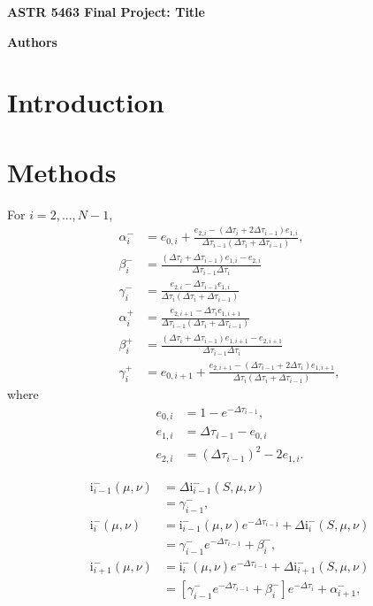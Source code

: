 \documentclass[12pt]{article}
\begin{document}
\begin{center}\begin{LARGE}
\textbf{ASTR 5463 Final Project: Title}
\end{LARGE}\end{center}

\begin{center}
\textbf{Authors}
\end{center}

\section{Introduction}



\section{Methods}

For $i = 2, ..., N - 1$,
\begin{align*}
\alpha_i^-
&=
e_{0, i} +
\frac{e_{2, i} - (\Delta\tau_i + 2\Delta\tau_{i - 1}) e_{1, i}}
     {\Delta\tau_{i - 1} (\Delta\tau_i + \Delta\tau_{i - 1})},
\\ \beta_i^-
&=
\frac{(\Delta\tau_i + \Delta\tau_{i - 1}) e_{1, i} - e_{2, i}}
     {\Delta\tau_{i - 1} \Delta\tau_i}
\\ \gamma_i^-
&=
\frac{e_{2, i} - \Delta\tau_{i - 1} e_{1, i}}
     {\Delta\tau_i (\Delta\tau_i + \Delta\tau_{i - 1})}
\\ \alpha_i^+
&=
\frac{e_{2, i + 1} - \Delta\tau_i e_{1, i + 1}}
     {\Delta\tau_{i - 1} (\Delta\tau_i + \Delta\tau_{i - 1})}
\\ \beta_i^+
&=
\frac{(\Delta\tau_i + \Delta\tau_{i - 1}) e_{1, i + 1} - e_{2, i + 1}}
     {\Delta\tau_{i - 1} \Delta\tau_i}
\\ \gamma_i^+
&=
e_{0, i + 1} +
\frac{e_{2, i + 1} - (\Delta\tau_{i - 1} + 2\Delta\tau_i) e_{1, i + 1}}
     {\Delta\tau_i (\Delta\tau_i + \Delta\tau_{i - 1})},
\end{align*}
where
\begin{align*}
e_{0, i}
&=
1 - e^{-\Delta\tau_{i - 1}},
\\ e_{1, i}
&=
\Delta\tau_{i - 1} - e_{0, i}
\\ e_{2, i}
&=
(\Delta\tau_{i - 1})^2 - 2 e_{1, i}.
\end{align*}

\begin{align*}
\text{i}_{i - 1}^- (\mu, \nu)
&=
\Delta\text{i}_{i - 1}^- (S, \mu, \nu)
\\ &=
\gamma_{i - 1}^-,
\\ \text{i}_{i}^- (\mu, \nu)
&=
\text{i}_{i - 1}^- (\mu, \nu) e^{-\Delta\tau_{i - 1}} +
    \Delta\text{i}_{i}^- (S, \mu, \nu)
\\ &=
\gamma_{i - 1}^- e^{-\Delta\tau_{i - 1}} + \beta_{i}^-,
\\ \text{i}_{i + 1}^- (\mu, \nu)
&=
\text{i}_{i}^- (\mu, \nu) e^{-\Delta\tau_{i - 1}} +
    \Delta\text{i}_{i + 1}^- (S, \mu, \nu)
\\ &=
[\gamma_{i - 1}^- e^{-\Delta\tau_{i - 1}} + \beta_{i}^-] e^{-\Delta\tau_{i}} +
    \alpha_{i + 1}^-,
\end{align*}
\end{document}
